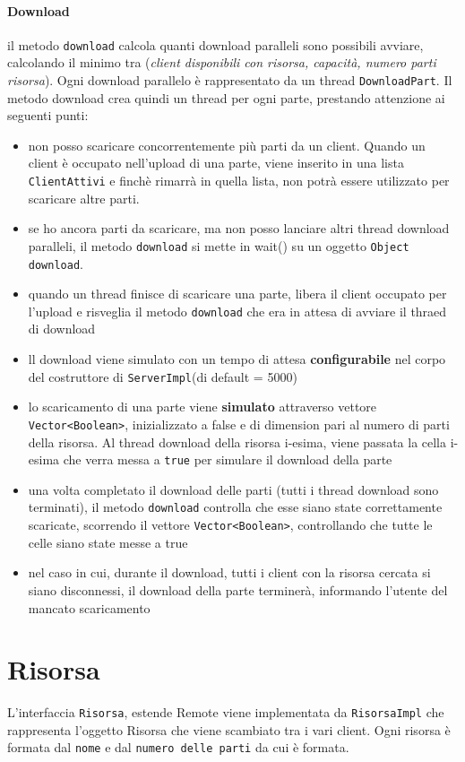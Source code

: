 \documentclass[10pt]{article}
\begin{document}
\paragraph{Download} il metodo {\verb!download!} calcola quanti download paralleli sono possibili avviare, calcolando il minimo tra (\textit{client disponibili con risorsa, capacità, numero parti risorsa}). Ogni download parallelo è rappresentato da un thread {\verb!DownloadPart!}. Il metodo download crea quindi un thread per ogni parte, prestando attenzione ai seguenti punti:
\begin{itemize}
	\item non posso scaricare concorrentemente più parti da un client. Quando un client è occupato nell'upload di una parte, viene inserito in una lista {\verb!ClientAttivi!} e finchè rimarrà in quella lista, non potrà essere utilizzato per scaricare altre parti.
	\item se ho ancora parti da scaricare, ma non posso lanciare altri thread download paralleli, il metodo {\verb!download!} si mette in wait() su un oggetto {\verb!Object download!}.
	\item quando un thread finisce di scaricare una parte, libera il client occupato per l'upload e risveglia il metodo {\verb!download!} che era in attesa di avviare il thraed di download
	\item ll download viene simulato con un tempo di attesa \textbf{configurabile} nel corpo del costruttore di {\verb!ServerImpl!}(di default = 5000)
	\item lo scaricamento di una parte viene \textbf{simulato} attraverso vettore {\verb!Vector<Boolean>!}, inizializzato a false e di dimension pari al numero di parti della risorsa. Al thread download della risorsa i-esima, viene passata la cella i-esima che verra messa a {\verb!true!} per simulare il download della parte
	\item una volta completato il download delle parti (tutti i thread download sono terminati), il metodo {\verb!download!} controlla che esse siano state correttamente scaricate, scorrendo il vettore {\verb!Vector<Boolean>!}, controllando che tutte le celle siano state messe a true
	\item nel caso in cui, durante il download, tutti i client con la risorsa cercata si siano disconnessi, il download della parte terminerà, informando l'utente del mancato scaricamento
\end{itemize}

\section{Risorsa}
L'interfaccia {\verb!Risorsa!}, estende Remote viene implementata da {\verb!RisorsaImpl!} che rappresenta l'oggetto Risorsa che viene scambiato tra i vari client.
Ogni risorsa è formata dal {\verb!nome!} e dal {\verb!numero delle parti!} da cui è formata.
\end{document}
